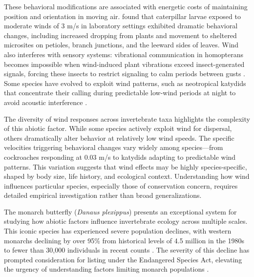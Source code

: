 These behavioral modifications are associated with energetic costs of maintaining position and orientation in moving air. \citet{leonardExposureWindAlters2016} found that caterpillar larvae exposed to moderate winds of 3 m/s in laboratory settings exhibited dramatic behavioral changes, including increased dropping from plants and movement to sheltered microsites on petioles, branch junctions, and the leeward sides of leaves. Wind also interferes with sensory systems: vibrational communication in homopterans becomes impossible when wind-induced plant vibrations exceed insect-generated signals, forcing these insects to restrict signaling to calm periods between gusts \citep{tishechkinVibrationalBackgroundNoise2013}. Some species have evolved to exploit wind patterns, such as neotropical katydids that concentrate their calling during predictable low-wind periods at night to avoid acoustic interference \citep{velillaGoneWindSignal2020}.

The diversity of wind responses across invertebrate taxa highlights the complexity of this abiotic factor. While some species actively exploit wind for dispersal, others dramatically alter behavior at relatively low wind speeds. The specific velocities triggering behavioral changes vary widely among species—from cockroaches responding at 0.03 m/s to katydids adapting to predictable wind patterns. This variation suggests that wind effects may be highly species-specific, shaped by body size, life history, and ecological context. Understanding how wind influences particular species, especially those of conservation concern, requires detailed empirical investigation rather than broad generalizations.


The monarch butterfly (\textit{Danaus plexippus}) presents an exceptional system for studying how abiotic factors influence invertebrate ecology across multiple scales. This iconic species has experienced severe population declines, with western monarchs declining by over 95\% from historical levels of 4.5 million in the 1980s to fewer than 30,000 individuals in recent counts \citep{schultzCitizenScienceMonitoring2017a, peltonWesternMonarchPopulation2019}. The severity of this decline has prompted consideration for listing under the Endangered Species Act, elevating the urgency of understanding factors limiting monarch populations \citep{croneWhyAreMonarch2019}.

